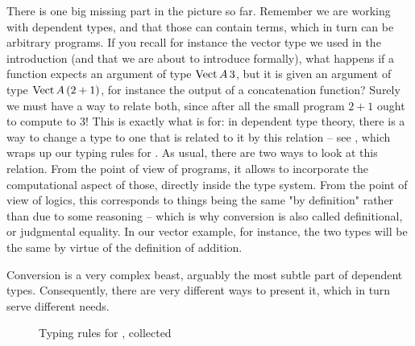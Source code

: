 There is one big missing part in the picture so far. Remember we are working with
dependent types, and that those can contain terms, which in turn can be arbitrary programs.
If you recall for instance the vector type we used in the introduction (and that we are
about to introduce formally), what happens if a function expects an argument of type
$\operatorname{Vect} A\,3$, but it is given an argument of type $\operatorname{Vect} A\,(2+1)$, for instance the output
of a concatenation function? Surely we must have a way to relate both, since after all
the small program $2+1$ ought to compute to $3$! This is exactly what  is
for: in dependent type theory, there is a way to change a type to one that
is related to it by this relation – see , which wraps up our typing
rules for .
As usual, there are two ways to look at this relation. From the point of view of programs,
it allows to incorporate the computational aspect of those, directly inside the type system.
From the point of view of logics, this corresponds to things being the same "by definition"
rather than due to some reasoning
– which is why conversion is also called definitional, or judgmental equality. In our vector
example, for instance, the two types will be the same by virtue of the definition of addition.

Conversion is a very complex beast, arguably the most subtle part of dependent types.
Consequently, there are very different ways to present it, which in turn serve different
needs.


\begin{figure*}
  \LastFloat


  \caption{Typing rules for , collected}
\end{figure*}